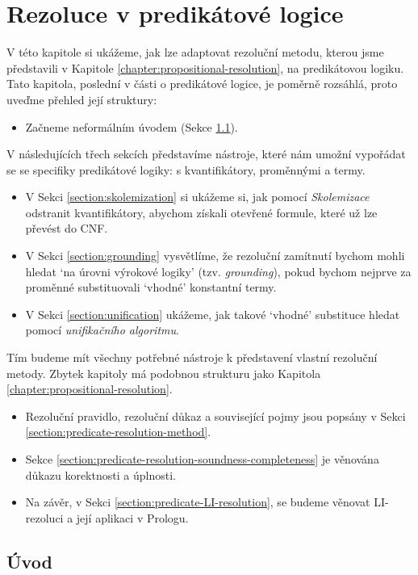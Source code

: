 \chapter{Rezoluce v predikátové logice} 
\label{chapter:predicate-resolution}

V této kapitole si ukážeme, jak lze adaptovat rezoluční metodu, kterou jsme představili v Kapitole \ref{chapter:propositional-resolution}, na predikátovou logiku. Tato kapitola, poslední v části o predikátové logice, je poměrně rozsáhlá, proto uveďme přehled její struktury: 

\begin{itemize}
    \item Začneme neformálním úvodem (Sekce \ref{section:predicate-resolution-intro}).
\end{itemize}
V následujících třech sekcích představíme nástroje, které nám umožní vypořádat se se specifiky predikátové logiky: s kvantifikátory, proměnnými a termy.
\begin{itemize}
    \item V Sekci \ref{section:skolemization} si ukážeme si, jak pomocí \emph{Skolemizace} odstranit kvantifikátory, abychom získali otevřené formule, které už lze převést do CNF.
    \item V Sekci \ref{section:grounding} vysvětlíme, že rezoluční zamítnutí bychom mohli hledat `na úrovni výrokové logiky' (tzv. \emph{grounding}), pokud bychom nejprve za proměnné substituovali `vhodné' konstantní termy.
    \item V Sekci \ref{section:unification} ukážeme, jak takové `vhodné' substituce hledat pomocí \emph{unifikačního algoritmu}.
\end{itemize}
Tím budeme mít všechny potřebné nástroje k představení vlastní rezoluční metody. Zbytek kapitoly má podobnou strukturu jako Kapitola \ref{chapter:propositional-resolution}.
\begin{itemize}
    \item Rezoluční pravidlo, rezoluční důkaz a související pojmy jsou popsány v Sekci \ref{section:predicate-resolution-method}.
    \item Sekce \ref{section:predicate-resolution-soundness-completeness} je věnována důkazu korektnosti a úplnosti.
    \item Na závěr, v Sekci \ref{section:predicate-LI-resolution}, se budeme věnovat LI-rezoluci a její aplikaci v Prologu.
\end{itemize}


\section{Úvod}\label{section:predicate-resolution-intro}
\todo

